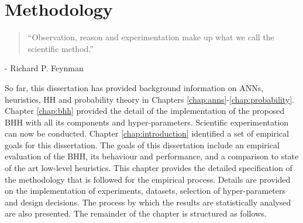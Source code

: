 \chapter{Methodology}\label{chap:methodology}

\begin{quotation}
      \noindent ``Observation, reason and experimentation make up what we call the scientific method.''
\end{quotation}
\begin{flushright}
      - Richard P. Feynman
\end{flushright}

\noindent
So far, this dissertation has provided background information on \acfp{ANN}, heuristics, \acf{HH} and probability theory in Chapters \ref{chap:anns}-\ref{chap:probability}. Chapter \ref{chap:bhh} provided the detail of the implementation of the proposed \acs{BHH} with all its components and hyper-parameters. Scientific experimentation can now be conducted. Chapter \ref{chap:introduction} identified a set of empirical goals for this dissertation. The goals of this dissertation include an empirical evaluation of the \acs{BHH}, its behaviour and performance, and a comparison to state of the art low-level heuristics. This chapter provides the detailed specification of the methodology that is followed for the empirical process. Details are provided on the implementation of experiments, datasets, selection of hyper-parameters and design decisions. The process by which the results are statistically analysed are also presented. The remainder of the chapter is structured as follows.

